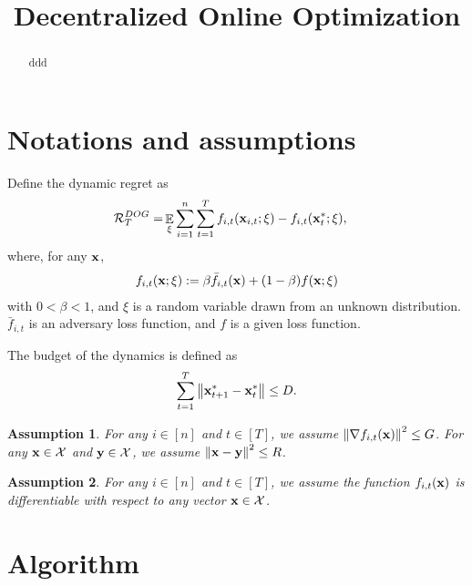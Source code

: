 \documentclass{article}
\title{Decentralized Online Optimization}
\newtheorem{Assumption}{\bf{Assumption}}
\begin{document}
\maketitle

\begin{abstract}
ddd
\end{abstract}

\section{Notations and assumptions}





Define the dynamic regret as
\begin{align}
\nonumber
{\mathcal{R}}_T^{DOG} = & \mathop{\mathbb{E}}_{\xi}\sum_{i=1}^n\sum_{t=1}^T f_{i,t}({\bf x}_{i,t};\xi) - f_{i,t}({\bf x}_t^\ast;\xi),
\end{align} where, for any ${\bf x}$,
\begin{align}
\nonumber
f_{i,t}({\bf x};\xi) := \beta \bar{f}_{i,t}({\bf x}) + (1-\beta) f({\bf x}; \xi)
\end{align} with $0<\beta<1$, and $\xi$ is a random variable drawn from an unknown distribution. $\bar{f}_{i,t}$ is an adversary loss function, and $f$ is a given loss function.



The budget of the dynamics is defined as
\begin{align}
\nonumber
\sum_{t=1}^T \left\lVert{\bf x}_{t+1}^\ast - {\bf x}_t^\ast\right\rVert \le D.
\end{align}



\begin{Assumption}
\label{assumption_bounded_gradient_domain}
For any $i\in[n]$ and $t\in[T]$, we assume $\left\lVert\nabla f_{i,t}({\bf x})\right\rVert^2 \le G$. For any ${\bf x}\in{\mathcal{X}}$ and ${\bf y}\in{\mathcal{X}}$, we assume $\left\lVert{\bf x}-{\bf y}\right\rVert^2 \le R$.
\end{Assumption}

\begin{Assumption}
\label{assumption_differentiable}
For any $i\in[n]$ and $t\in[T]$, we assume the function $f_{i,t}({\bf x})$ is differentiable with respect to any vector ${\bf x}\in{\mathcal{X}}$.
\end{Assumption}




\section{Algorithm}
\end{document}
